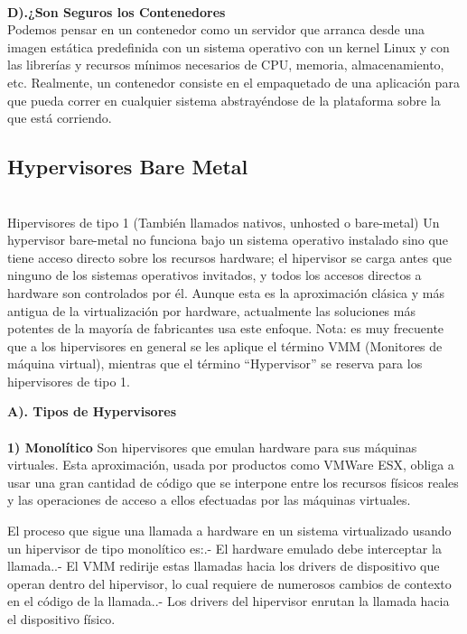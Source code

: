 \documentclass[twoside,twocolumn]{article}
\begin{document}
\begin{flushright}
\begin{itemize}
\textbf{}\\
 \textbf{D).¿Son Seguros los Contenedores}\\
\textbf{}Podemos pensar en un contenedor como un servidor que arranca desde una imagen estática predefinida con un sistema operativo con un kernel Linux y con las librerías y recursos mínimos necesarios de CPU, memoria, almacenamiento, etc. Realmente, un contenedor consiste en el empaquetado de una aplicación para que pueda correr en cualquier sistema abstrayéndose de la plataforma sobre la que está corriendo.\\



\subsection{Hypervisores Bare Metal}
\textbf{}\\
Hipervisores de tipo 1 (También llamados nativos, unhosted o bare-metal)
Un hypervisor bare-metal no funciona bajo un sistema operativo instalado sino que tiene acceso directo sobre los recursos hardware; el hipervisor se carga antes que ninguno de los sistemas operativos invitados, y todos los accesos directos a hardware son controlados por él.
Aunque esta es la aproximación clásica y más antigua de la virtualización por hardware, actualmente las soluciones más potentes de la mayoría de fabricantes usa este enfoque.
Nota: es muy frecuente que a los hipervisores en general se les aplique el término VMM (Monitores de máquina virtual), mientras que el término “Hypervisor” se reserva para los hipervisores de tipo 1.


 \textbf{A). Tipos de Hypervisores }\\
\textbf{}\\

\textbf{1) Monolítico}\newline
Son hipervisores que emulan hardware para sus máquinas virtuales.
Esta aproximación, usada por productos como VMWare ESX, obliga a usar una gran cantidad de código que se interpone entre los recursos físicos reales y las operaciones de acceso a ellos efectuadas por las máquinas virtuales.\newline

El proceso que sigue una llamada a hardware en un sistema virtualizado usando un hipervisor de tipo monolítico es:.- El hardware emulado debe interceptar la llamada..- El VMM redirije estas llamadas hacia los drivers de dispositivo que operan dentro del hipervisor, lo cual requiere de numerosos cambios de contexto en el código de la llamada..- Los drivers del hipervisor enrutan la llamada hacia el dispositivo físico.\newline
    


\end{itemize}
\end{flushright}
\end{document}
